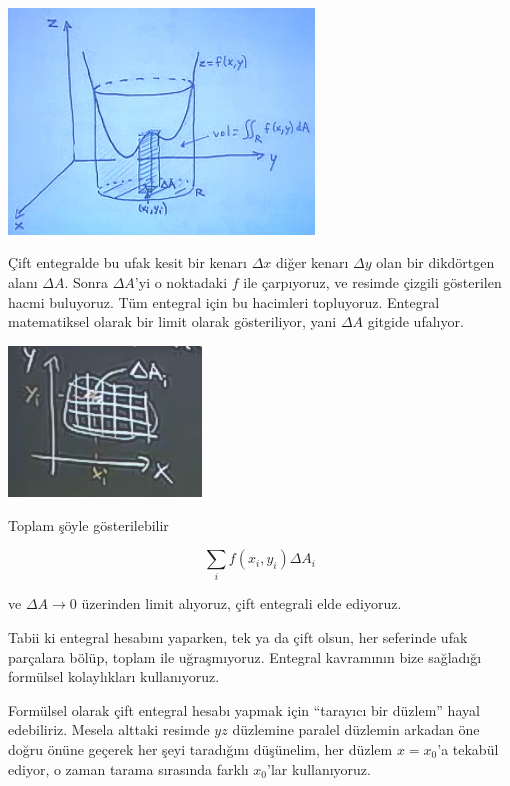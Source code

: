 \documentclass[12pt,fleqn]{article}\usepackage{../../common}
\begin{document}
\begin{center}
\includegraphics[height=6cm]{16_3.png}
\end{center}

Çift entegralde bu ufak kesit bir kenarı $\Delta x$ diğer kenarı $\Delta y$ olan
bir dikdörtgen alanı $\Delta A$. Sonra $\Delta A$'yi o noktadaki $f$ ile
çarpıyoruz, ve resimde çizgili gösterilen hacmi buluyoruz. Tüm entegral için bu
hacimleri topluyoruz. Entegral matematiksel olarak bir limit olarak
gösteriliyor, yani $\Delta A$ gitgide ufalıyor.

\begin{center}
\includegraphics[height=4cm]{16_4.png}
\end{center}

Toplam şöyle gösterilebilir

$$ \sum_i f(x_i,y_i) \Delta A_i $$

ve $\Delta A \to 0$ üzerinden limit alıyoruz, çift entegrali elde ediyoruz. 

Tabii ki entegral hesabını yaparken, tek ya da çift olsun, her seferinde ufak
parçalara bölüp, toplam ile uğraşmıyoruz. Entegral kavramının bize sağladığı
formülsel kolaylıkları kullanıyoruz.

Formülsel olarak çift entegral hesabı yapmak için ``tarayıcı bir düzlem'' hayal
edebiliriz. Mesela alttaki resimde $yz$ düzlemine paralel düzlemin arkadan öne
doğru önüne geçerek her şeyi taradığını düşünelim, her düzlem $x=x_0$'a tekabül
ediyor, o zaman tarama sırasında farklı $x_0$'lar kullanıyoruz.
\end{document}

